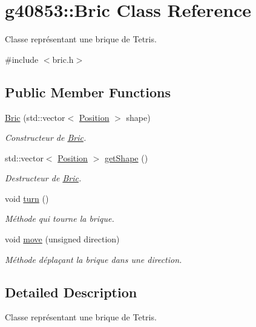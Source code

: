 \hypertarget{classg40853_1_1_bric}{}\section{g40853\+:\+:Bric Class Reference}
\label{classg40853_1_1_bric}


Classe représentant une brique de Tetris.  




{\ttfamily \#include $<$bric.\+h$>$}

\subsection*{Public Member Functions}
\begin{DoxyCompactItemize}
\item 
\hyperlink{classg40853_1_1_bric_a77e2c56fe648b8418ad19c312f8974e6}{Bric} (std\+::vector$<$ \hyperlink{classg40853_1_1_position}{Position} $>$ shape)
\begin{DoxyCompactList}\small\item\em Constructeur de \hyperlink{classg40853_1_1_bric}{Bric}. \end{DoxyCompactList}\item 
std\+::vector$<$ \hyperlink{classg40853_1_1_position}{Position} $>$ \hyperlink{classg40853_1_1_bric_a9f35f552f3528ab117a864b230d8bb54}{get\+Shape} ()
\begin{DoxyCompactList}\small\item\em Destructeur de \hyperlink{classg40853_1_1_bric}{Bric}. \end{DoxyCompactList}\item 
void \hyperlink{classg40853_1_1_bric_aa962ac3aada1e2aaf234effa2544d07e}{turn} ()
\begin{DoxyCompactList}\small\item\em Méthode qui tourne la brique. \end{DoxyCompactList}\item 
void \hyperlink{classg40853_1_1_bric_aa77e0c1fdc6b32e9121f6db4c7630bfc}{move} (unsigned direction)
\begin{DoxyCompactList}\small\item\em Méthode déplaçant la brique dans une direction. \end{DoxyCompactList}\end{DoxyCompactItemize}


\subsection{Detailed Description}
Classe représentant une brique de Tetris. 

